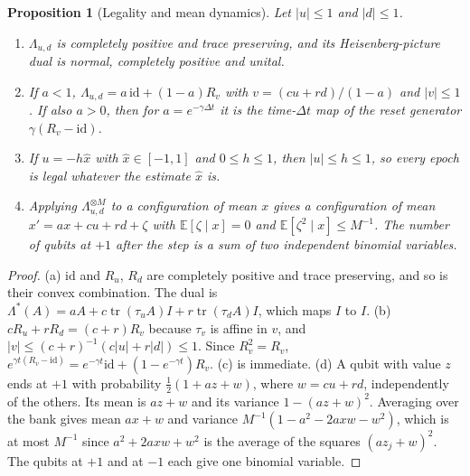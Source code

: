 \documentclass[12pt]{article}
\newtheorem{proposition}[theorem]{Proposition}
\theoremstyle{definition}
\theoremstyle{remark}
\begin{document}
\begin{proposition}[Legality and mean dynamics]\label{prop:bank_legal}
Let $|u|\le1$ and $|d|\le1$.
\begin{enumerate}[label=(\alph*),itemsep=0pt]
\item $\Lambda_{u,d}$ is completely positive and trace preserving, and its Heisenberg-picture dual is normal, completely positive and unital.
\item If $a<1$, $\Lambda_{u,d}=a\,\mathrm{id}+(1-a)R_v$ with $v=(cu+rd)/(1-a)$ and $|v|\le1$. If also $a>0$, then for $a=e^{-\gamma\Delta t}$ it is the time-$\Delta t$ map of the reset generator $\gamma(R_v-\mathrm{id})$.
\item If $u=-h\hat x$ with $\hat x\in[-1,1]$ and $0\le h\le1$, then $|u|\le h\le1$, so every epoch is legal whatever the estimate $\hat x$ is.
\item Applying $\Lambda_{u,d}^{\otimes M}$ to a configuration of mean $x$ gives a configuration of mean $x'=ax+cu+rd+\zeta$ with $\mathbb E[\zeta\mid x]=0$ and $\mathbb E[\zeta^2\mid x]\le M^{-1}$. The number of qubits at $+1$ after the step is a sum of two independent binomial variables.
\end{enumerate}
\end{proposition}
\begin{proof}
(a) $\mathrm{id}$ and $R_u$, $R_d$ are completely positive and trace preserving, and so is their convex combination. The dual is $\Lambda^*(A)=aA+c\operatorname{tr}(\tau_uA)I+r\operatorname{tr}(\tau_dA)I$, which maps $I$ to $I$. (b) $cR_u+rR_d=(c+r)R_v$ because $\tau_v$ is affine in $v$, and $|v|\le(c+r)^{-1}(c|u|+r|d|)\le1$. Since $R_v^2=R_v$, $e^{\gamma t(R_v-\mathrm{id})}=e^{-\gamma t}\mathrm{id}+(1-e^{-\gamma t})R_v$. (c) is immediate. (d) A qubit with value $z$ ends at $+1$ with probability $\tfrac12(1+az+w)$, where $w=cu+rd$, independently of the others. Its mean is $az+w$ and its variance $1-(az+w)^2$. Averaging over the bank gives mean $ax+w$ and variance $M^{-1}(1-a^2-2axw-w^2)$, which is at most $M^{-1}$ since $a^2+2axw+w^2$ is the average of the squares $(az_j+w)^2$. The qubits at $+1$ and at $-1$ each give one binomial variable.
\end{proof}
\end{document}
